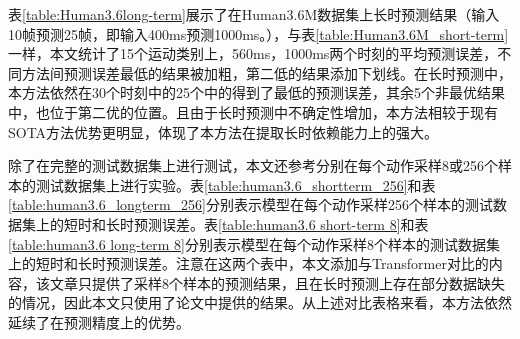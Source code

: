 表\ref{table:Human3.6long-term}展示了在Human3.6M数据集上长时预测结果（输入10帧预测25帧，即输入400ms预测1000ms。），与表\ref{table:Human3.6M_short-term}一样，本文统计了15个运动类别上，560ms，1000ms两个时刻的平均预测误差，不同方法间预测误差最低的结果被加粗，第二低的结果添加下划线。在长时预测中，本方法依然在30个时刻中的25个中的得到了最低的预测误差，其余5个非最优结果中，也位于第二优的位置。且由于长时预测中不确定性增加，本方法相较于现有SOTA方法优势更明显，体现了本方法在提取长时依赖能力上的强大。

除了在完整的测试数据集上进行测试，本文还参考\parencite{li2020dynamic, mao2019learning, martinez2017human,mao2020history}分别在每个动作采样8或256个样本的测试数据集上进行实验。表\ref{table:human3.6_shortterm_256}和表\ref{table:human3.6_longterm_256}分别表示模型在每个动作采样256个样本的测试数据集上的短时和长时预测误差。表\ref{table:human3.6 short-term 8}和表\ref{table:human3.6 long-term 8}分别表示模型在每个动作采样8个样本的测试数据集上的短时和长时预测误差。注意在这两个表中，本文添加与Transformer\parencite{aksan2021spatio}对比的内容，该文章只提供了采样8个样本的预测结果，且在长时预测上存在部分数据缺失的情况，因此本文只使用了论文中提供的结果。从上述对比表格来看，本方法依然延续了在预测精度上的优势。

\clearpage

